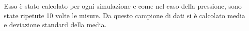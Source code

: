 Esso è stato calcolato per ogni simulazione e come nel caso della pressione, sono state ripetute 10 volte le misure. Da questo campione di dati si è calcolato media e deviazione standard della media.
\begin{center}
\begin{figure}

	\centering
\end{figure}
\end{center}
